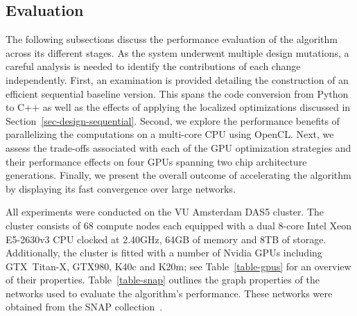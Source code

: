 \subsection{Evaluation}
\label{sec-evaluation}

The following subsections discuss the performance evaluation of the algorithm
across its different stages. As the system underwent multiple design mutations,
a careful analysis is needed to identify the contributions of each change
independently.
%
First, an examination is provided detailing the construction of an efficient
sequential baseline version.
This spans
the code conversion from Python to C++ as well as the effects of applying
the localized optimizations discussed in
Section~\ref{sec-design-sequential}.
%
Second, we explore the performance benefits of parallelizing the computations
on a multi-core CPU using OpenCL.
%
Next, we assess the trade-offs associated with each of the GPU optimization
strategies and their performance effects on four GPUs spanning two chip
architecture generations.
%
Finally, we present the overall outcome of accelerating the algorithm by
displaying its fast convergence over large networks.

All experiments were conducted on the VU Amsterdam DAS5 cluster. The cluster
consists of 68 compute nodes each equipped with a dual 8-core Intel Xeon
E5-2630v3 CPU clocked at 2.40GHz, 64GB of memory and 8TB of storage.
Additionally, the cluster is fitted with a number of Nvidia GPUs including
GTX~\mbox{Titan-X}, GTX980, K40c and K20m; see Table~\ref{table-gpus} for an overview of
their properties. Table~\ref{table-snap} outlines the graph
properties of the networks used to evaluate the algorithm's performance. These
networks were obtained from the SNAP collection~\cite{snapnets}.

\begin{comment}
\begin{table}[tb]
\center\begin{tabular}{l r r c}
Network & \#Vertices & \#Edges \\
\hline
CA-HepPh        &    12,008 &    118,521 \\
com-DBLP        &   317,080 &  1,049,866 \\
com-LiveJournal & 3,997,962 & 34,681,189 \\
\hline
\\[-1ex]
\end{tabular}
\caption{Network graphs from the Stanford Snap collection}
\label{table-snap}
\end{table}
\end{comment}

